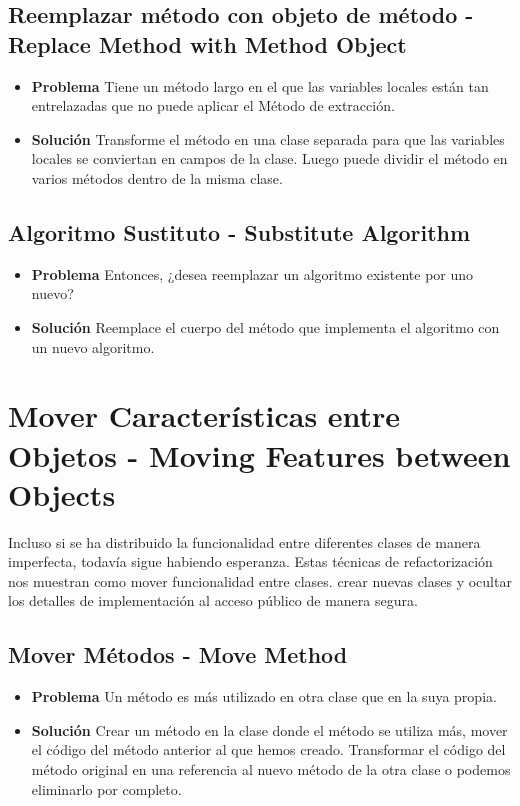 \documentclass[11pt,a4paper,oneside]{book}
\begin{document}
\subsection{Reemplazar método con objeto de método - Replace Method with Method Object}
\label{replacemethodwithmethodobject}
\begin{itemize}
    \item \textbf{Problema} Tiene un método largo en el que las variables locales están tan entrelazadas que no puede aplicar el Método de extracción.
    \item \textbf{Solución} Transforme el método en una clase separada para que las variables locales se conviertan en campos de la clase. Luego puede dividir el método en varios métodos dentro de la misma clase.
\end{itemize}



\subsection{Algoritmo Sustituto - Substitute Algorithm}
\label{substitutealgorithm}
\begin{itemize}
    \item \textbf{Problema} Entonces, ¿desea reemplazar un algoritmo existente por uno nuevo?
    \item \textbf{Solución} Reemplace el cuerpo del método que implementa el algoritmo con un nuevo algoritmo.
\end{itemize}




\section{Mover Características entre Objetos - Moving Features between Objects}

\label{renombrarmetodo} Incluso si se ha distribuido la funcionalidad entre diferentes clases de manera imperfecta, todavía sigue habiendo esperanza.
Estas técnicas de refactorización nos muestran como mover funcionalidad entre clases. crear nuevas clases y ocultar los detalles de implementación al acceso público de manera segura.


\subsection{Mover Métodos - Move Method}  
\begin{itemize}
    \item \textbf{Problema} Un método es más utilizado en otra clase que en la suya propia.
    \item \textbf{Solución} Crear un método en la clase donde el método se utiliza más, mover el código del método anterior al que hemos creado. Transformar el código del método original en una referencia al nuevo método de la otra clase o podemos eliminarlo por completo.
\end{itemize}
    
\end{document}
